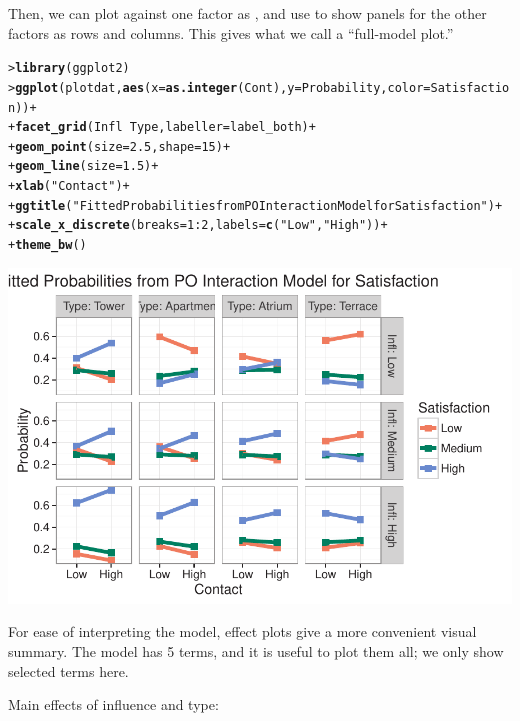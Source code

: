 \documentclass[10pt]{report}\usepackage[]{graphicx}\usepackage[]{color}
\makeatletter
\newcommand{\hlnum}[1]{\textcolor[rgb]{0.686,0.059,0.569}{#1}}%
\newcommand{\hlstr}[1]{\textcolor[rgb]{0.192,0.494,0.8}{#1}}%
\newcommand{\hlopt}[1]{\textcolor[rgb]{0,0,0}{#1}}%
\newcommand{\hlstd}[1]{\textcolor[rgb]{0.345,0.345,0.345}{#1}}%
\newcommand{\hlkwc}[1]{\textcolor[rgb]{0.333,0.667,0.333}{#1}}%
\newcommand{\hlkwd}[1]{\textcolor[rgb]{0.737,0.353,0.396}{\textbf{#1}}}%
\newenvironment{kframe}{%
 \def\at@end@of@kframe{}%
 \ifinner\ifhmode%
  \def\at@end@of@kframe{\end{minipage}}%
  \begin{minipage}{\columnwidth}%
 \fi\fi%
 \def\FrameCommand##1{\hskip\@totalleftmargin \hskip-\fboxsep
 \colorbox{shadecolor}{##1}\hskip-\fboxsep
     \hskip-\linewidth \hskip-\@totalleftmargin \hskip\columnwidth}%
 \MakeFramed {\advance\hsize-\width
   \@totalleftmargin\z@ \linewidth\hsize
   \@setminipage}}%
 {\par\unskip\endMakeFramed%
 \at@end@of@kframe}
\newenvironment{knitrout}{}{} %
\renewenvironment{knitrout}{\small\renewcommand{\baselinestretch}{.85}}{} %
\makeatother
\begin{document}
\begin{Exercises}
\begin{enumerate*}
\begin{ans}
    Then, we can plot  against one factor as ,
    and use  to show panels for the other factors as rows
    and columns.  This gives what we call a ``full-model plot.''
\begin{knitrout}\footnotesize
{}\color{fgcolor}\begin{kframe}
\begin{alltt}
\hlstd{> }\hlkwd{library}\hlstd{(ggplot2)}
\hlstd{> }\hlkwd{ggplot}\hlstd{(plotdat,} \hlkwd{aes}\hlstd{(}\hlkwc{x} \hlstd{=} \hlkwd{as.integer}\hlstd{(Cont),} \hlkwc{y} \hlstd{= Probability,} \hlkwc{color} \hlstd{= Satisfaction))} \hlopt{+}
\hlstd{+ }  \hlkwd{facet_grid}\hlstd{(Infl} \hlopt{~} \hlstd{Type,} \hlkwc{labeller}\hlstd{=label_both)} \hlopt{+}
\hlstd{+ }  \hlkwd{geom_point}\hlstd{(}\hlkwc{size}\hlstd{=}\hlnum{2.5}\hlstd{,} \hlkwc{shape}\hlstd{=}\hlnum{15}\hlstd{)} \hlopt{+}
\hlstd{+ }  \hlkwd{geom_line}\hlstd{(}\hlkwc{size}\hlstd{=}\hlnum{1.5}\hlstd{)} \hlopt{+}
\hlstd{+ }  \hlkwd{xlab}\hlstd{(}\hlstr{"Contact"}\hlstd{)} \hlopt{+}
\hlstd{+ }  \hlkwd{ggtitle}\hlstd{(}\hlstr{"Fitted Probabilities from PO Interaction Model for Satisfaction"}\hlstd{)} \hlopt{+}
\hlstd{+ }  \hlkwd{scale_x_discrete}\hlstd{(}\hlkwc{breaks}\hlstd{=}\hlnum{1}\hlopt{:}\hlnum{2}\hlstd{,} \hlkwc{labels}\hlstd{=}\hlkwd{c}\hlstd{(}\hlstr{"Low"}\hlstd{,}\hlstr{"High"}\hlstd{))} \hlopt{+}
\hlstd{+ }  \hlkwd{theme_bw}\hlstd{()}
\end{alltt}
\end{kframe}

\centerline{\includegraphics[width=.5\textwidth]{soln/fig/ex8_2c3-1} }



\end{knitrout}
    For ease of interpreting the model, effect plots give a more convenient visual summary.
    The model has 5 terms, and it is useful to plot them all;  we only show selected terms here.
    
    Main effects of influence and type:


\end{ans}
\end{enumerate*}
\end{Exercises}
\end{document}
